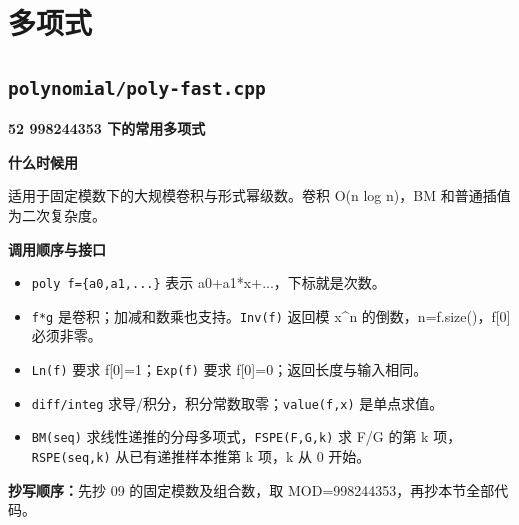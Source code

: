 \documentclass[UTF8,a4paper,10pt]{ctexart}
\newcommand{\TemplUsage}[1]{\textbf{什么时候用}\par #1\par}
\newcommand{\TemplApi}[1]{\textbf{调用顺序与接口}\par #1\par}
\begin{document}
\section{多项式}
\subsection{\texttt{polynomial/poly-fast.cpp}}
\textbf{52 998244353 下的常用多项式}

\TemplUsage{适用于固定模数下的大规模卷积与形式幂级数。卷积 O(n log n)，BM 和普通插值为二次复杂度。}
\TemplApi{\begin{itemize}
\item \texttt{poly f=\{a0,a1,...\}} 表示 a0+a1*x+...，下标就是次数。
\item \texttt{f*g} 是卷积；加减和数乘也支持。\texttt{Inv(f)} 返回模 x\textasciicircum{}n 的倒数，n=f.size()，f[0] 必须非零。
\item \texttt{Ln(f)} 要求 f[0]=1；\texttt{Exp(f)} 要求 f[0]=0；返回长度与输入相同。
\item \texttt{diff/integ} 求导/积分，积分常数取零；\texttt{value(f,x)} 是单点求值。
\item \texttt{BM(seq)} 求线性递推的分母多项式，\texttt{FSPE(F,G,k)} 求 F/G 的第 k 项，\texttt{RSPE(seq,k)} 从已有递推样本推第 k 项，k 从 0 开始。
\end{itemize}}
\textbf{抄写顺序：}先抄 09 的固定模数及组合数，取 MOD=998244353，再抄本节全部代码。
\end{document}
